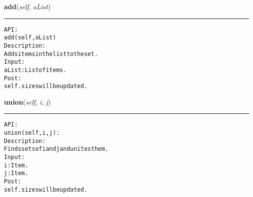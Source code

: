     \vspace{0.5ex}

\hspace{.8\funcindent}\begin{boxedminipage}{\funcwidth}

    \raggedright \textbf{add}(\textit{self}, \textit{aList})

    \vspace{-1.5ex}

    \rule{\textwidth}{0.5\fboxrule}
\setlength{\parskip}{2ex}
\begin{alltt}

API:
    add(self, aList)
Description:
    Adds items in the list to the set.
Input:
    aList: List of items.
Post:
    self.sizes will be updated.
\end{alltt}

\setlength{\parskip}{1ex}
    \end{boxedminipage}

    \label{coinor:gimpy:graph:DisjointSet:union}

    \vspace{0.5ex}

\hspace{.8\funcindent}\begin{boxedminipage}{\funcwidth}

    \raggedright \textbf{union}(\textit{self}, \textit{i}, \textit{j})

    \vspace{-1.5ex}

    \rule{\textwidth}{0.5\fboxrule}
\setlength{\parskip}{2ex}
\begin{alltt}

API:
    union(self, i, j):
Description:
    Finds sets of i and j and unites them.
Input:
    i: Item.
    j: Item.
Post:
    self.sizes will be updated.
\end{alltt}

\setlength{\parskip}{1ex}
    \end{boxedminipage}

    \label{coinor:gimpy:graph:DisjointSet:find}


